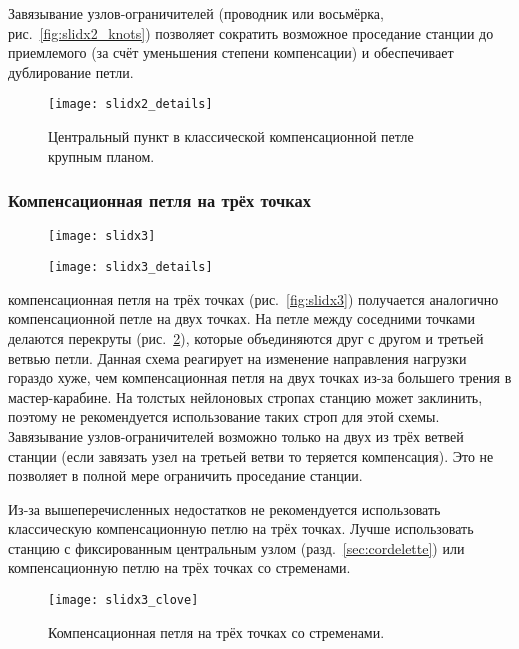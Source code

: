 \documentclass[fleqn, 12pt]{extarticle}
\begin{document}
    Завязывание узлов-ограничителей (проводник или восьмёрка, рис.~\ref{fig:slidx2_knots}) позволяет сократить возможное проседание станции до приемлемого (за счёт уменьшения степени компенсации)
    и обеспечивает дублирование петли.
    
    \begin{figure}
        \centering
        \texttt{[image: slidx2\_details]}
        \caption{Центральный пункт в классической компенсационной петле крупным планом.}\label{fig:slidx2_details}
    \end{figure}
    
    \subsubsection{Компенсационная петля на трёх точках}
    \begin{figure}[h]
        \centering
        \begin{minipage}[t]{0.45\textwidth}
            \texttt{[image: slidx3]}
            \label{fig:slidx3}
        \end{minipage}\hspace{0.05\textwidth}
        \begin{minipage}[t]{0.45\textwidth}
            \texttt{[image: slidx3\_details]}
            \label{fig:slidx3_details}
        \end{minipage} 
    \end{figure}
     компенсационная петля на трёх точках (рис.~\ref{fig:slidx3}) получается аналогично компенсационной петле на двух точках. На петле между соседними точками делаются перекруты
    (рис.~\ref{fig:slidx3_details}),
    которые объединяются друг с другом и третьей ветвью петли. Данная схема реагирует на изменение направления нагрузки гораздо хуже, чем компенсационная петля на двух точках
    из-за большего трения в мастер-карабине. На толстых нейлоновых стропах станцию может заклинить, поэтому не рекомендуется использование таких строп для этой схемы.
    Завязывание узлов-ограничителей возможно только на двух из трёх ветвей станции (если завязать узел на третьей ветви то теряется компенсация). Это не позволяет в полной мере
    ограничить проседание станции.
    
    Из-за вышеперечисленных недостатков не рекомендуется использовать классическую компенсационную петлю на трёх точках. Лучше использовать станцию с фиксированным центральным узлом
    (разд.~\ref{sec:cordelette}) или компенсационную петлю на трёх точках со стременами.
    \begin{figure}[h]
        \centering
        \texttt{[image: slidx3\_clove]}
        \caption{Компенсационная петля на трёх точках со стременами.}\label{fig:slidx3_clove}
    \end{figure}
    
\end{document}
